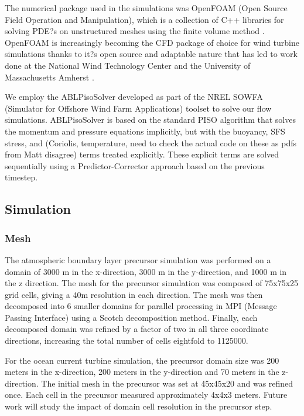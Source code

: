 The numerical package used in the simulations was OpenFOAM (Open Source Field Operation and Manipulation), which is a collection of C++ libraries for solving PDE?s on unstructured meshes using the finite volume method \cite{OpenFOAM}. OpenFOAM is increasingly becoming the CFD package of choice for wind turbine simulations thanks to it?s open source and adaptable nature that has led to work done at the National Wind Technology Center and the University of Massachusetts Amherst \cite{}.  

We employ the ABLPisoSolver developed as part of the NREL SOWFA (Simulator for Offshore Wind Farm Applications) toolset \cite{Matt and Sang} to solve our flow simulations.  ABLPisoSolver is based on the standard PISO algorithm that solves the momentum and pressure equations implicitly, but with the buoyancy, SFS stress, and (Coriolis, temperature, need to check the actual code on these as pdfs from Matt disagree) terms treated explicitly.  These explicit terms are solved sequentially using a Predictor-Corrector approach based on the previous timestep.  

\subsection{Simulation}


\subsubsection{Mesh}

The atmospheric boundary layer precursor simulation was performed on a domain of 3000 m in the x-direction, 3000 m in the y-direction, and 1000 m in the z direction.  The mesh for the precursor simulation was composed of 75x75x25 grid cells, giving a 40m resolution in each direction.  The mesh was then decomposed into 6 smaller domains for parallel processing in MPI (Message Passing Interface) using a Scotch decomposition method.  Finally, each decomposed domain was refined by a factor of two in all three coordinate directions, increasing the total number of cells eightfold to 1125000. 

For the ocean current turbine simulation, the precursor domain size was 200 meters in the x-direction, 200 meters in the y-direction and 70 meters in the z-direction. The initial mesh in the precursor was set at 45x45x20 and was refined once. Each cell in the precursor measured approximately 4x4x3 meters. Future work will study the impact of domain cell resolution in the precursor step.


